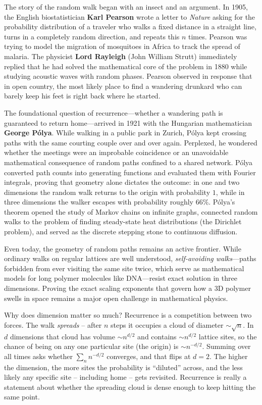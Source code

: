 \begin{historybox}
The story of the random walk began with an insect and an argument. In 1905, the English
biostatistician \textbf{Karl Pearson} wrote a letter to \emph{Nature} asking
for the probability distribution of a traveler who walks a fixed distance in a straight line,
turns in a completely random direction, and repeats this $n$ times. Pearson was trying to model
the migration of mosquitoes in Africa to track the spread of malaria.
The physicist \textbf{Lord Rayleigh} (John William Strutt) immediately replied that he had
solved the mathematical core of the problem in 1880 while studying
acoustic waves with random phases. Pearson observed in response
that in open country, the most likely place to find a wandering drunkard who can barely keep
his feet is right back where he started.

The foundational question of recurrence---whether a wandering path is guaranteed to return
home---arrived in 1921 with the Hungarian mathematician \textbf{George P\'olya}. While walking
in a public park in Zurich, P\'olya kept crossing paths with the same courting couple over and
over again. Perplexed, he wondered whether the meetings were an
improbable coincidence or an unavoidable mathematical consequence of random paths confined to
a shared network. P\'olya converted path counts into generating functions and evaluated them with
Fourier integrals, proving that geometry alone dictates the outcome: in one and two dimensions
the random walk returns to the origin with probability $1$, while in three dimensions the walker
escapes with probability roughly $66\%$. P\'olya's theorem opened the study of Markov
chains on infinite graphs, connected random walks to the problem of finding steady-state heat distributions (the Dirichlet problem),
and served as the discrete stepping stone to continuous diffusion.

Even today, the geometry of random paths remains an active frontier. While ordinary walks on
regular lattices are well understood, \emph{self-avoiding walks}---paths forbidden from ever
visiting the same site twice, which serve as mathematical models for long polymer
molecules like DNA---resist exact solution in three dimensions. Proving the exact scaling
exponents that govern how a 3D polymer swells in space remains a major open
challenge in mathematical physics.
\end{historybox}

\begin{happeningbox}
Why does dimension matter so much? Recurrence is a competition between two
forces. The walk \emph{spreads} -- after $n$ steps it occupies a cloud of
diameter $\sim \sqrt{n}$. In $d$ dimensions that cloud has volume $\sim
n^{d/2}$ and contains $\sim n^{d/2}$ lattice sites, so the chance of being on
any one particular site (the origin) is $\sim n^{-d/2}$. Summing over all
times asks whether $\sum_n n^{-d/2}$ converges, and that flips at $d = 2$. The
higher the dimension, the more sites the probability is ``diluted'' across, and
the less likely any specific site -- including home -- gets revisited. Recurrence
is really a statement about whether the spreading cloud is dense enough to keep
hitting the same point.
\end{happeningbox}

